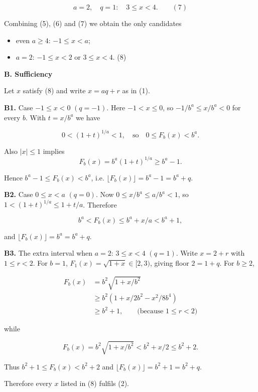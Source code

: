 \documentclass[12pt,a4paper]{article}
\theoremstyle{definition}
\begin{document}
    $$a = 2, \quad q = 1: \quad 3 \leq x < 4. \qquad (7)$$

    Combining (5), (6) and (7) we obtain the only candidates

    \begin{itemize}
        \item even $a \geq 4$: $-1 \leq x < a$;
        \item $a = 2$: $-1 \leq x < 2$ or $3 \leq x < 4$. \qquad (8)
    \end{itemize}

    \textbf{B. Sufficiency}

    Let $x$ satisfy (8) and write $x = aq + r$ as in (1).

    \textbf{B1.} Case $-1 \leq x < 0$ $(q = -1)$.
    Here $-1 < x \leq 0$, so $-1/b^a \leq x/b^a < 0$ for every $b$.
    With $t = x/b^a$ we have

    $$0 < (1+t)^{1/a} < 1, \quad \text{so} \quad 0 \leq F_b(x) < b^a.$$

    Also $|x| \leq 1$ implies
    $$F_b(x) = b^a (1+t)^{1/a} \geq b^a - 1.$$

    Hence $b^a - 1 \leq F_b(x) < b^a$, i.e. $\lfloor F_b(x) \rfloor = b^a - 1 = b^a + q$.

    \textbf{B2.} Case $0 \leq x < a$ $(q = 0)$.
    Now $0 \leq x/b^a \leq a/b^a < 1$, so $1 < (1+t)^{1/a} \leq 1 + t/a$.
    Therefore

    $$b^a < F_b(x) \leq b^a + x/a < b^a + 1,$$

    and $\lfloor F_b(x) \rfloor = b^a = b^a + q$.

    \textbf{B3.} The extra interval when $a = 2$: $3 \leq x < 4$ $(q = 1)$.
    Write $x = 2 + r$ with $1 \leq r < 2$.
    For $b = 1$, $F_1(x) = \sqrt{1+x} \in [2, 3)$, giving floor $2 = 1 + q$.
    For $b \geq 2$,

    \begin{align}
        F_b(x) &= b^2 \sqrt{1+x/b^2} \\
        &\geq b^2(1 + x/2b^2 - x^2/8b^4) \\
        &\geq b^2 + 1, \qquad \text{(because } 1 \leq r < 2\text{)}
    \end{align}

    while

    $$F_b(x) = b^2 \sqrt{1+x/b^2} < b^2 + x/2 \leq b^2 + 2.$$

    Thus $b^2 + 1 \leq F_b(x) < b^2 + 2$ and $\lfloor F_b(x) \rfloor = b^2 + 1 = b^2 + q$.

    Therefore every $x$ listed in (8) fulfils (2).
\end{document}
